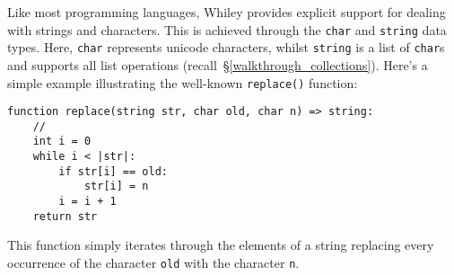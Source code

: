 Like most programming languages, Whiley provides explicit support for dealing with strings and characters.  This is achieved through the \lstinline{char} and \lstinline{string} data types.  Here, \lstinline{char} represents unicode characters, whilst \lstinline{string} is a list of \lstinline{char}s and supports all list operations (recall~\S\ref{walkthrough_collections}).  Here's a simple example illustrating the well-known \lstinline{replace()} function:

\begin{lstlisting}
function replace(string str, char old, char n) => string:
    //
    int i = 0
    while i < |str|:
        if str[i] == old:
            str[i] = n
        i = i + 1
    return str    
\end{lstlisting}

This function simply iterates through the elements of a string replacing every occurrence of the character \lstinline{old} with the character \lstinline{n}.
